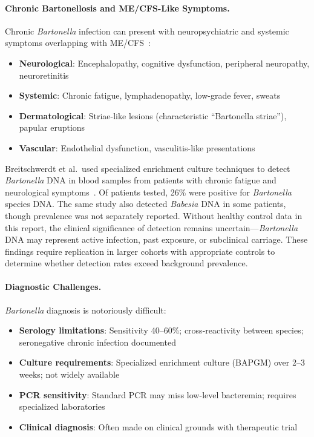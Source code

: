 \paragraph{Chronic Bartonellosis and ME/CFS-Like Symptoms.}
Chronic \emph{Bartonella} infection can present with neuropsychiatric and systemic symptoms overlapping with ME/CFS~\cite{BartonellaCFS2025}:
\begin{itemize}
    \item \textbf{Neurological}: Encephalopathy, cognitive dysfunction, peripheral neuropathy, neuroretinitis
    \item \textbf{Systemic}: Chronic fatigue, lymphadenopathy, low-grade fever, sweats
    \item \textbf{Dermatological}: Striae-like lesions (characteristic ``Bartonella striae''), papular eruptions
    \item \textbf{Vascular}: Endothelial dysfunction, vasculitis-like presentations
\end{itemize}

\begin{observation}
\label{obs:bartonella-cfs}
Breitschwerdt et al.\ used specialized enrichment culture techniques to detect \emph{Bartonella} DNA in blood samples from patients with chronic fatigue and neurological symptoms~\cite{BartonellaCFS2025}. Of patients tested, 26\% were positive for \emph{Bartonella} species DNA. The same study also detected \emph{Babesia} DNA in some patients, though prevalence was not separately reported. Without healthy control data in this report, the clinical significance of detection remains uncertain---\emph{Bartonella} DNA may represent active infection, past exposure, or subclinical carriage. These findings require replication in larger cohorts with appropriate controls to determine whether detection rates exceed background prevalence.
\end{observation}

\paragraph{Diagnostic Challenges.}
\emph{Bartonella} diagnosis is notoriously difficult:
\begin{itemize}
    \item \textbf{Serology limitations}: Sensitivity 40--60\%; cross-reactivity between species; seronegative chronic infection documented
    \item \textbf{Culture requirements}: Specialized enrichment culture (BAPGM) over 2--3 weeks; not widely available
    \item \textbf{PCR sensitivity}: Standard PCR may miss low-level bacteremia; requires specialized laboratories
    \item \textbf{Clinical diagnosis}: Often made on clinical grounds with therapeutic trial
\end{itemize}


